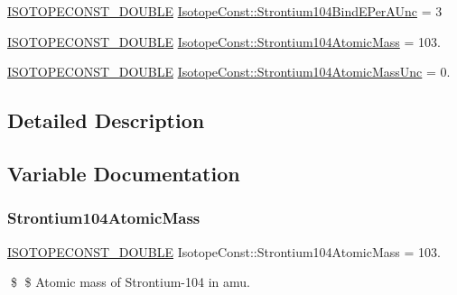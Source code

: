\begin{DoxyCompactItemize}
\mbox{\hyperlink{group___isotope_const-_macros_ga8f45a7272ce02c0b4c65c44636ed719a}{I\+S\+O\+T\+O\+P\+E\+C\+O\+N\+S\+T\+\_\+\+D\+O\+U\+B\+LE}} \mbox{\hyperlink{group___isotope_const-_strontium-_sr104_gabb3be4d2a5abf95b02768f685da35376}{Isotope\+Const\+::\+Strontium104\+Bind\+E\+Per\+A\+Unc}} = 3
\item 
\mbox{\hyperlink{group___isotope_const-_macros_ga8f45a7272ce02c0b4c65c44636ed719a}{I\+S\+O\+T\+O\+P\+E\+C\+O\+N\+S\+T\+\_\+\+D\+O\+U\+B\+LE}} \mbox{\hyperlink{group___isotope_const-_strontium-_sr104_ga598ed5eeb58938a8125dc52117d4a918}{Isotope\+Const\+::\+Strontium104\+Atomic\+Mass}} = 103.
\item 
\mbox{\hyperlink{group___isotope_const-_macros_ga8f45a7272ce02c0b4c65c44636ed719a}{I\+S\+O\+T\+O\+P\+E\+C\+O\+N\+S\+T\+\_\+\+D\+O\+U\+B\+LE}} \mbox{\hyperlink{group___isotope_const-_strontium-_sr104_ga2311558087d166ca5363d2f1039fff3b}{Isotope\+Const\+::\+Strontium104\+Atomic\+Mass\+Unc}} = 0.
\end{DoxyCompactItemize}


\subsection{Detailed Description}


\subsection{Variable Documentation}
\mbox{\label{group___isotope_const-_strontium-_sr104_ga598ed5eeb58938a8125dc52117d4a918}} 
\subsubsection{\texorpdfstring{Strontium104\+Atomic\+Mass}{Strontium104AtomicMass}}
{\footnotesize\ttfamily \mbox{\hyperlink{group___isotope_const-_macros_ga8f45a7272ce02c0b4c65c44636ed719a}{I\+S\+O\+T\+O\+P\+E\+C\+O\+N\+S\+T\+\_\+\+D\+O\+U\+B\+LE}} Isotope\+Const\+::\+Strontium104\+Atomic\+Mass = 103.}

\$ \$ Atomic mass of Strontium-\/104 in amu. \mbox{\label{group___isotope_const-_strontium-_sr104_ga2311558087d166ca5363d2f1039fff3b}} 
